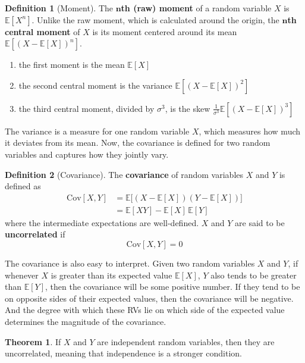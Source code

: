 \documentclass{article}
\theoremstyle{definition}
\newtheorem{theorem}{Theorem}[section]
\theoremstyle{remark}
\theoremstyle{definition}
\newtheorem{definition}{Definition}[section]
\begin{document}
\begin{definition}[Moment]
The \textbf{$\mathbf{n}$th (raw) moment} of a random variable $X$ is $\mathbb{E}[X^n]$. Unlike the raw moment, which is calculated around the origin, the \textbf{$\mathbf{n}$th central moment} of $X$ is its moment centered around its mean $\mathbb{E}[(X - \mathbb{E}[X])^n]$. 
\begin{enumerate}
    \item the first moment is the mean $\mathbb{E}[X]$
    \item the second central moment is the variance $\mathbb{E}[(X - \mathbb{E}[X])^2]$ 
    \item the third central moment, divided by $\sigma^3$, is the skew $\frac{1}{\sigma^3} \mathbb{E}[(X - \mathbb{E}[X])^3]$ 
\end{enumerate}
\end{definition}

The variance is a measure for one random variable $X$, which measures how much it deviates from its mean. Now, the covariance is defined for two random variables and captures how they jointly vary. 

\begin{definition}[Covariance]
The \textbf{covariance} of random variables $X$ and $Y$ is defined as 
\begin{align*}
    \mathrm{Cov}[X, Y] & = \mathbb{E} \big[ (X - \mathbb{E}[X]) (Y - \mathbb{E}[X]) \big] \\
    & = \mathbb{E}[X Y] - \mathbb{E}[X] \, \mathbb{E}[Y]
\end{align*}
where the intermediate expectations are well-defined. $X$ and $Y$ are said to be \textbf{uncorrelated} if 
\[\mathrm{Cov}[X, Y] = 0\]
\end{definition}

The covariance is also easy to interpret. Given two random variables $X$ and $Y$, if whenever $X$ is greater than its expected value $\mathbb{E}[X]$, $Y$ also tends to be greater than $\mathbb{E}[Y]$, then the covariance will be some positive number. If they tend to be on opposite sides of their expected values, then the covariance will be negative. And the degree with which these RVs lie on which side of the expected value determines the magnitude of the covariance. 

\begin{theorem}
If $X$ and $Y$ are independent random variables, then they are uncorrelated, meaning that independence is a stronger condition. 
\end{theorem}
\end{document}

